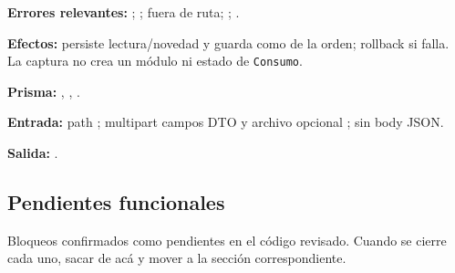 \textbf{Errores relevantes:} \texttt{}; \texttt{}; \texttt{} fuera de ruta; \texttt{}; \texttt{}.  

\textbf{Efectos:} persiste lectura/novedad y guarda \texttt{} como \texttt{} de la orden; rollback si falla. La captura no crea un módulo ni estado de \texttt{Consumo}.  

\textbf{Prisma:} \texttt{}, \texttt{}, \texttt{}.  

\textbf{Entrada:} path \texttt{}; multipart campos DTO y archivo opcional \texttt{}; sin body JSON.  

\textbf{Salida:} \texttt{}.


\subsection{Pendientes funcionales}

Bloqueos confirmados como pendientes en el código revisado. Cuando se cierre cada uno, sacar de acá y mover a la sección correspondiente.

